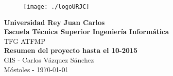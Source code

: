 \setlength{\unitlength}{1 cm} %
\thispagestyle{empty}
\begin{figure}[htb]
\begin{center}
\texttt{[image: ./logoURJC]}
\end{center}
\end{figure}
\begin{center}
\textbf{{\Huge Universidad Rey Juan Carlos}\\[0.5cm]
{\LARGE Escuela Técnica Superior Ingeniería Informática}}\\[1.25cm]
{\Large  TFG ATFMP}\\[2cm]
{\LARGE \textbf{Resumen del proyecto hasta el 10-2015}}\\[2cm]
{\large GIS - Carlos Vázquez Sánchez}\\[0.5cm]
Móstoles - \today
\end{center}